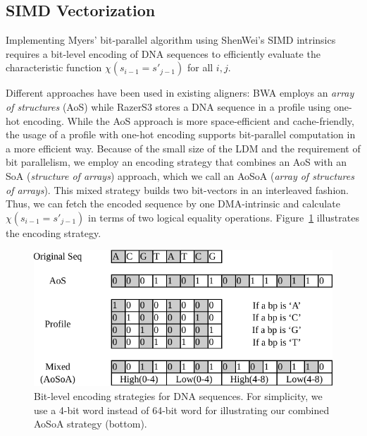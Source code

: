 \documentclass[conference]{IEEEtran}
\begin{document}


\subsection{SIMD Vectorization}
Implementing Myers' bit-parallel algorithm using ShenWei's SIMD intrinsics requires a bit-level encoding of DNA sequences to efficiently evaluate the characteristic function $\chi(s_{i-1} = s'_{j-1})$ for all $i, j$.

Different approaches have been used in existing aligners: BWA \cite{bwa} employs an {\em array of structures} (AoS) while RazerS3 \cite{razers3} stores a DNA sequence in a profile using one-hot encoding. While the AoS approach is more space-efficient and cache-friendly, the usage of a profile with one-hot encoding supports bit-parallel computation in a more efficient way.  Because of the small size of the LDM and the requirement of bit parallelism, we employ an encoding strategy that combines an AoS with an SoA ({\em structure of arrays}) approach, which we call an AoSoA ({\em array of structures of arrays}). This mixed strategy builds two bit-vectors in an interleaved fashion. Thus, we can fetch the encoded sequence by one DMA-intrinsic and calculate $\chi(s_{i-1} = s'_{j-1})$ in terms of two logical equality operations. Figure~\ref{MixPack}  illustrates the encoding strategy.

\begin{figure}[!htb]
	\includegraphics[width=0.9\linewidth]{figures/MixPack}
	\caption{Bit-level encoding strategies for DNA sequences. For simplicity, we use a 4-bit word instead of 64-bit word for illustrating our combined AoSoA strategy (bottom).}
	\label{MixPack}
\end{figure}
\end{document}
